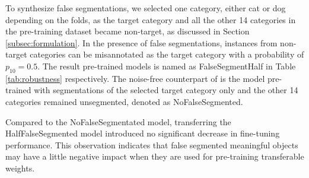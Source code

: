 To synthesize false segmentations, we selected one category, either cat or dog depending on the folds, as the target category and all the other 14 categories in the pre-training dataset became non-target, as discussed in Section \ref{subsec:formulation}.
In the presence of false segmentations, instances from non-target categories can be misannotated as the target category with a probability of $p_{10}= 0.5$.
The result pre-trained models is named as FalseSegmentHalf in Table \ref{tab:robustness} respectively.
The noise-free counterpart of is the model pre-trained with segmentations of the selected target category only and the other 14 categories remained unsegmented, denoted as NoFalseSegmented.

Compared to the NoFalseSegmentated model, transferring the HalfFalseSegmented model introduced no significant decrease in fine-tuning performance.
This observation indicates that false segmented meaningful objects may have a little negative impact when they are used for pre-training transferable weights.



